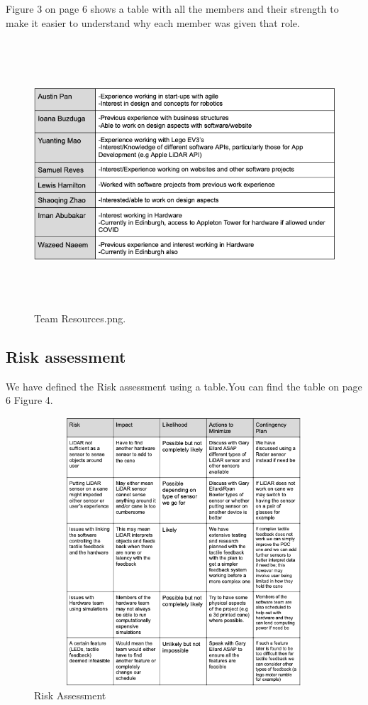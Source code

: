 \documentclass{article}
\begin{document}
Figure 3 on page 6 shows a table with all the members and their strength to make it easier to understand why each member was given that role.
\begin{figure}[h]
\begin{center}
  \includegraphics[width=1\textwidth,height=10cm]{Team Resources.png}
  \caption{Team Resources.png.}
  \end{center}
\end{figure}
\subsection{Risk assessment} 
We have defined the Risk assessment using a table.You can find the table on page 6 Figure 4. 
\begin{figure}[h]
\begin{center}
  \includegraphics[width=1\textwidth,height=10cm]{Risk assesment.png}
  \caption{Risk Assessment}
   \end{center}
\end{figure}
\end{document}
